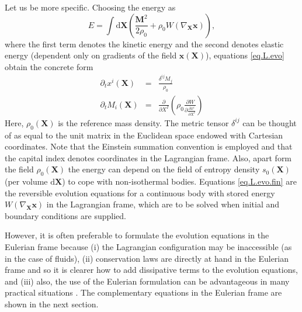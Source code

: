 \documentclass[
10pt, %
a4paper, %
oneside, %
headinclude,footinclude, %
BCOR5mm, %
]{scrartcl}
\newcommand{\xx}{\mathbf{x}}
\newcommand{\XX}{\mathbf{X}}
\newcommand{\dX}{\mathrm{d}\XX}
\newcommand{\MM}{\mathbf{M}}
\begin{document}
Let us be more specific. Choosing the energy as
\begin{equation}\label{eq.Ene.L}
	E = \int\dX \left(\frac{\MM^2}{2\rho_0} + \rho_0 W(\nabla_\XX \xx)\right),
\end{equation}
where the first term denotes the kinetic energy and the second denotes elastic energy (dependent only on gradients of the field $\xx(\XX)$), equations \eqref{eq.L.evo} obtain the concrete form
\begin{subequations}\label{eq.L.evo.fin}
	\begin{eqnarray}
		\partial_t x^i(\XX) &=& \frac{\delta^{ij} M_j}{\rho_0}\\
		\partial_t M_i(\XX) &=& \frac{\partial}{\partial X^I}\left(\rho_0 \frac{\partial W}{\partial \frac{\partial x^i}{\partial X^I}}\right)
	\end{eqnarray}
\end{subequations}
Here, $\rho_0(\XX)$ is the reference mass density. The metric tensor $\delta^{ij}$ can be thought of as equal to the 
	unit matrix in the Euclidean space endowed with Cartesian coordinates. Note that the Einstein 
	summation convention is employed and that the capital index denotes coordinates in the 
	Lagrangian frame. Also, apart form the field $\rho_0(\XX)$ the energy can depend on the field of 
	entropy density $s_0(\XX)$ (per volume $\dX$) to cope with non-isothermal bodies. Equations 
	\eqref{eq.L.evo.fin} are the reversible evolution equations for a continuous body with stored 
	energy $W(\nabla_\XX \xx)$ in the Lagrangian frame, which are to be solved when initial and 
	boundary conditions are supplied. 

However, it is often preferable to formulate the evolution equations in the Eulerian frame because (i) the Lagrangian configuration may be inaccessible (as in the case of fluids), (ii) conservation laws are directly at hand in the Eulerian frame and so it is clearer how to add dissipative terms to the evolution equations, and (iii) also, the use of the Eulerian formulation can be advantageous in many practical situations \cite{Hyper-Hypo2019}. The complementary equations in the Eulerian frame are shown in the next section.
\end{document}
